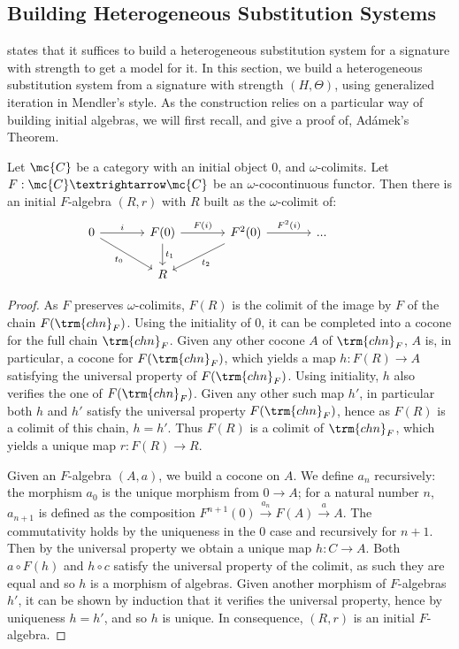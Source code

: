 \subsection{Building Heterogeneous Substitution Systems}
\label{subsec:building_hss}

 states that it suffices to build a heterogeneous
substitution system for a signature with strength to get a model for it.
%
In this section, we build a heterogeneous substitution system from a signature
with strength $(H, \Theta)$, using generalized iteration in Mendler's style.
%
As the construction relies on a particular way of building initial algebras, we
will first recall, and give a proof of, Adámek's Theorem.

\begin{theorem}
  \label{thm:adamek}
  Let $\mc{C}$ be a category with an initial object $0$, and
  $\omega$-colimits. Let $F : \mc{C} → \mc{C}$ be an $\omega$-cocontinuous
  functor.
  Then there is an initial $F$-algebra $(R,r)$ with $R$ built as the
  $\omega$-colimit of:
  \[
    \begin{tikzcd}[column sep=large]
      0 \ar[r, "i"] \ar[dr, swap, "t_0"]
        & F(0) \ar[r, "F(i)"] \ar[d, "t_1"]
        & F^2(0) \ar[r, "F^2(i)"] \ar[dl, "t_2"]
        & ... \\
      & R
        &
        &
        &
    \end{tikzcd}
  \]

\end{theorem}
\begin{proof}
  As $F$ preserves $\omega$-colimits, $F(R)$ is the colimit of the image by
  $F$ of the chain $F(\trm{chn}_F)$.
  Using the initiality of $0$, it can be completed into a cocone for the
  full chain $\trm{chn}_F$.
   Given any other cocone $A$ of $\trm{chn}_F$, $A$ is, in particular, a
   cocone for $F(\trm{chn}_F)$, which yields a map $h : F(R) → A$
   satisfying the universal property of $F(\trm{chn}_F)$.
   Using initiality, $h$ also verifies the one of $F(\trm{chn}_F)$.
  Given any other such map $h'$, in particular both $h$ and $h'$ satisfy the
  universal property $F(\trm{chn}_F)$, hence as $F(R)$ is a colimit of this
  chain, $h = h'$.
  Thus $F(R)$ is a colimit of $\trm{chn}_F$, which yields a unique map
  $r : F(R) → R$.

  Given an $F$-algebra $(A,a)$, we build a cocone on $A$.
  We define $a_n$ recursively: the morphism $a_0$ is the unique morphism
  from $0 → A$; for a natural number $n$, $a_{n+1}$ is defined as the
  composition $F^{n+1}(0) \xrightarrow{a_n} F(A) \xrightarrow{a} A$.
  The commutativity holds by the uniqueness in the $0$ case and recursively
  for $n+1$.
  Then by the universal property we obtain a unique map $h : C → A$.
  Both $a∘ F(h)$ and $h ∘ c$ satisfy the universal property of the
  colimit, as such they are equal and so $h$ is a morphism of algebras.
  Given another morphism of $F$-algebras $h'$, it can be shown by induction
  that it verifies the universal property, hence by uniqueness $h = h'$, and
  so $h$ is unique.
  In consequence, $(R,r)$ is an initial $F$-algebra.
\end{proof}

